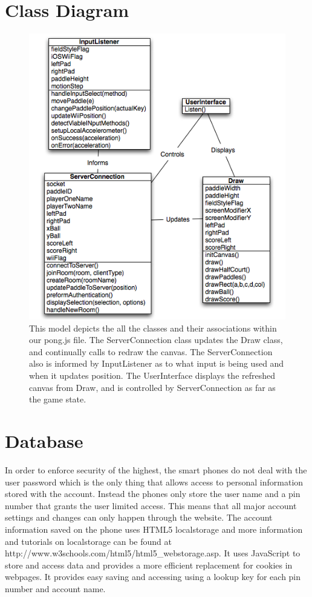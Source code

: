 \documentclass[12pt]{article}
\begin{document}
\begin{itemize}
\section{Class Diagram}
\begin{figure}
\begin{center}
\includegraphics[scale=.5]{ClassDiagram.png}
\caption{\label{Class Diagram}This model depicts the all the classes and their associations within our pong.js file.  The ServerConnection class updates the Draw class, and continually calls to redraw the canvas.  The ServerConnection also is informed by InputListener as to what input is being used and when it updates position.  The UserInterface displays the refreshed canvas from Draw, and is controlled by ServerConnection as far as the game state.}
\end{center}
\end{figure}

\section{Database}
In order to enforce security of the highest, the smart phones do not deal with the user password which is the only thing that allows access to personal information stored with the account. Instead the phones only store the user name and a pin number that grants the user limited access. This means that all major account settings and changes can only happen through the website. The account information saved on the phone uses HTML5 localstorage and more information and tutorials on localstorage can be found at http://www.w3schools.com/html5/html5_webstorage.asp. It uses JavaScript to store and access data and provides a more efficient replacement for cookies in webpages. It provides easy saving and accessing using a lookup key for each pin number and account name.


\end{itemize}
\end{document}
